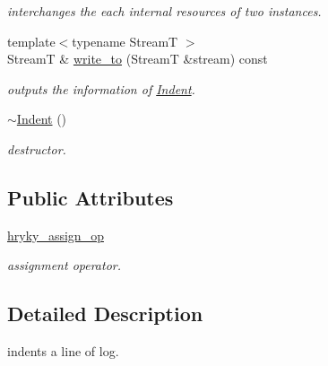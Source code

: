 \begin{DoxyCompactItemize}
\begin{DoxyCompactList}\small\item\em interchanges the each internal resources of two instances. \end{DoxyCompactList}\item 
\hypertarget{classhryky_1_1_indent_a3dcdc6227cdbfa80da9791c243c24818}{{\footnotesize template$<$typename Stream\-T $>$ }\\Stream\-T \& \hyperlink{classhryky_1_1_indent_a3dcdc6227cdbfa80da9791c243c24818}{write\-\_\-to} (Stream\-T \&stream) const }\label{classhryky_1_1_indent_a3dcdc6227cdbfa80da9791c243c24818}

\begin{DoxyCompactList}\small\item\em outputs the information of \hyperlink{classhryky_1_1_indent}{Indent}. \end{DoxyCompactList}\item 
\hypertarget{classhryky_1_1_indent_a6e2ce8a28937cd3888871888481129db}{\hyperlink{classhryky_1_1_indent_a6e2ce8a28937cd3888871888481129db}{$\sim$\-Indent} ()}\label{classhryky_1_1_indent_a6e2ce8a28937cd3888871888481129db}

\begin{DoxyCompactList}\small\item\em destructor. \end{DoxyCompactList}\end{DoxyCompactItemize}
\subsection*{Public Attributes}
\begin{DoxyCompactItemize}
\item 
\hypertarget{classhryky_1_1_indent_a8e06c30462da872865afb7e2e1a7a122}{\hyperlink{classhryky_1_1_indent_a8e06c30462da872865afb7e2e1a7a122}{hryky\-\_\-assign\-\_\-op}}\label{classhryky_1_1_indent_a8e06c30462da872865afb7e2e1a7a122}

\begin{DoxyCompactList}\small\item\em assignment operator. \end{DoxyCompactList}\end{DoxyCompactItemize}


\subsection{Detailed Description}
indents a line of log. 

